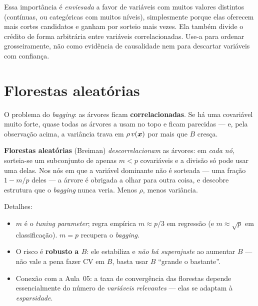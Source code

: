\documentclass[11pt,a4paper]{article}
\begin{document}
\begin{atencao}
Essa importância é \emph{enviesada} a favor de variáveis com muitos valores
distintos (contínuas, ou categóricas com muitos níveis), simplesmente porque elas
oferecem mais cortes candidatos e ganham por sorteio mais vezes. Ela também divide o
crédito de forma arbitrária entre variáveis correlacionadas. Use-a para ordenar
grosseiramente, não como evidência de causalidade nem para descartar variáveis com
confiança.
\end{atencao}

\section{Florestas aleatórias}
O problema do \emph{bagging}: as árvores ficam \textbf{correlacionadas}. Se há uma
covariável muito forte, quase todas as árvores a usam no topo e ficam parecidas ---
e, pela observação acima, a variância trava em $\rho\,v(\bm{x})$ por mais que $B$ cresça.

\begin{ideia}
\textbf{Florestas aleatórias} (Breiman) \emph{descorrelacionam} as árvores: em
\emph{cada nó}, sorteia-se um subconjunto de apenas $m<p$ covariáveis e a divisão
só pode usar uma delas. Nos nós em que a variável dominante não é sorteada --- uma
fração $1-m/p$ deles --- a árvore é obrigada a olhar para outra coisa, e descobre
estrutura que o \emph{bagging} nunca veria. Menos $\rho$, menos variância.
\end{ideia}

\noindent Detalhes:
\begin{itemize}[leftmargin=1.4cm,nosep]
  \item $m$ é o \emph{tuning parameter}; regra empírica $m\approx p/3$ em regressão
        (e $m\approx\sqrt p$ em classificação). $m=p$ recupera o \emph{bagging}.
  \item O risco é \textbf{robusto a $B$}: ele estabiliza e \emph{não há
        superajuste} ao aumentar $B$ --- não vale a pena fazer CV em $B$, basta
        usar $B$ ``grande o bastante''.
  \item Conexão com a Aula~05: a taxa de convergência das florestas depende
        essencialmente do número de \emph{variáveis relevantes} --- elas se adaptam
        à \emph{esparsidade}.
\end{itemize}
\end{document}
